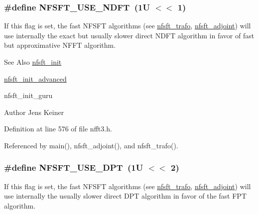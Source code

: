 \hypertarget{group__nfsft_gaba029560a4a506c8f2dad185511db827}{
\subsubsection[{N\-F\-S\-F\-T\-\_\-\-U\-S\-E\-\_\-\-N\-D\-F\-T}]{\setlength{\rightskip}{0pt plus 5cm}\#define N\-F\-S\-F\-T\-\_\-\-U\-S\-E\-\_\-\-N\-D\-F\-T~(1\-U $<$$<$ 1)}}\label{group__nfsft_gaba029560a4a506c8f2dad185511db827}
If this flag is set, the fast N\-F\-S\-F\-T algorithms (see \hyperlink{group__nfsft_ga5796fc68c432d46dfcab7abd8c56ee22}{nfsft\-\_\-trafo}, \hyperlink{group__nfsft_ga813bb48d404c7286310733c99a81a169}{nfsft\-\_\-adjoint}) will use internally the exact but usually slower direct N\-D\-F\-T algorithm in favor of fast but approximative N\-F\-F\-T algorithm.

\begin{DoxySeeAlso}{See Also}
\hyperlink{group__nfsft_ga65cda3f4a3edc5eb39c697cf34b1f0b9}{nfsft\-\_\-init} 

\hyperlink{group__nfsft_ga2812aa5beba0eb7efd3072bf323a0155}{nfsft\-\_\-init\-\_\-advanced} 

nfsft\-\_\-init\-\_\-guru 
\end{DoxySeeAlso}
\begin{DoxyAuthor}{Author}
Jens Keiner 
\end{DoxyAuthor}


Definition at line 576 of file nfft3.\-h.



Referenced by main(), nfsft\-\_\-adjoint(), and nfsft\-\_\-trafo().

\hypertarget{group__nfsft_ga6b9eed1e7bcf862dcc3111509075fcbb}{
\subsubsection[{N\-F\-S\-F\-T\-\_\-\-U\-S\-E\-\_\-\-D\-P\-T}]{\setlength{\rightskip}{0pt plus 5cm}\#define N\-F\-S\-F\-T\-\_\-\-U\-S\-E\-\_\-\-D\-P\-T~(1\-U $<$$<$ 2)}}\label{group__nfsft_ga6b9eed1e7bcf862dcc3111509075fcbb}
If this flag is set, the fast N\-F\-S\-F\-T algorithms (see \hyperlink{group__nfsft_ga5796fc68c432d46dfcab7abd8c56ee22}{nfsft\-\_\-trafo}, \hyperlink{group__nfsft_ga813bb48d404c7286310733c99a81a169}{nfsft\-\_\-adjoint}) will use internally the usually slower direct D\-P\-T algorithm in favor of the fast F\-P\-T algorithm.

